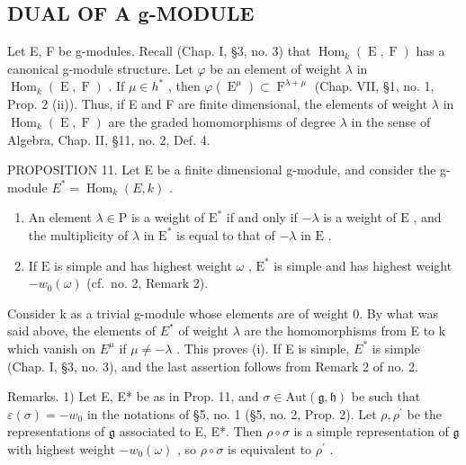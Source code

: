 \subsection{DUAL OF A g-MODULE}

Let E, F be g-modules. Recall (Chap. I, §3, no. 3) that \(\operatorname{Hom}_{k}(\operatorname{E},\operatorname{F})\) has a canonical g-module structure. Let \(\varphi\) be an element of weight \(\lambda\) in \(\operatorname{Hom}_{k}(\operatorname{E},\operatorname{F})\) . If \(\mu \in h^{*}\) , then \(\varphi(\operatorname{E}^{\mu}) \subset \operatorname{F}^{\lambda + \mu}\) (Chap. VII, §1, no. 1, Prop. 2 (ii)). Thus, if E and F are finite dimensional, the elements of weight \(\lambda\) in \(\operatorname{Hom}_{k}(\operatorname{E},\operatorname{F})\) are the graded homomorphisms of degree \(\lambda\) in the sense of Algebra, Chap. II, §11, no. 2, Def. 4.

PROPOSITION 11. Let E be a finite dimensional g-module, and consider the g-module \(E^{*} = \operatorname{Hom}_{k}(E, k)\) .

\begin{enumerate}
\def\labelenumi{(\roman{enumi})}
\item
  An element \(\lambda \in \mathrm{P}\) is a weight of \(\mathrm{E}^*\) if and only if \(-\lambda\) is a weight of \(\mathrm{E}\) , and the multiplicity of \(\lambda\) in \(\mathrm{E}^*\) is equal to that of \(-\lambda\) in \(\mathrm{E}\) .
\item
  If \(\mathrm{E}\) is simple and has highest weight \(\omega\) , \(\mathrm{E}^*\) is simple and has highest weight \(-w_0(\omega)\) (cf.~no. 2, Remark 2).
\end{enumerate}

Consider k as a trivial g-module whose elements are of weight 0. By what was said above, the elements of \(E^{*}\) of weight \(\lambda\) are the homomorphisms from E to k which vanish on \(E^{\mu}\) if \(\mu \neq -\lambda\) . This proves (i). If E is simple, \(E^{*}\) is simple (Chap. I, §3, no. 3), and the last assertion follows from Remark 2 of no. 2.

Remarks. 1) Let E, E* be as in Prop. 11, and \(\sigma \in \mathrm{Aut}(\mathfrak{g},\mathfrak{h})\) be such that \(\varepsilon (\sigma) = -w_0\) in the notations of §5, no. 1 (§5, no. 2, Prop. 2). Let \(\rho ,\rho^{\prime}\) be the representations of \(\mathfrak{g}\) associated to E, E*. Then \(\rho \circ \sigma\) is a simple representation of \(\mathfrak{g}\) with highest weight \(-w_{0}(\omega)\) , so \(\rho \circ \sigma\) is equivalent to \(\rho^{\prime}\) .

